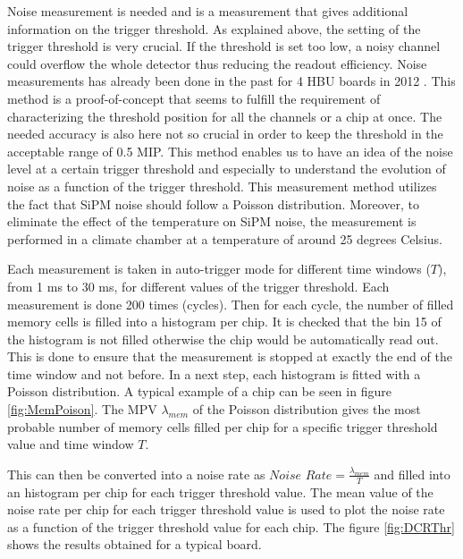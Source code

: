 Noise measurement is needed and is a measurement that gives additional information on the trigger threshold. As explained above, the setting of the trigger threshold is very crucial. If the threshold is set too low, a noisy channel could overflow the whole detector thus reducing the readout efficiency. Noise measurements has already been done in the past for 4 HBU boards in 2012 \cite{Hermberg:2015gaa}. This method is a proof-of-concept that seems to fulfill the requirement of characterizing the threshold position for all the channels or a chip at once. The needed accuracy is also here not so crucial in order to keep the threshold in the acceptable range of 0.5 MIP. This method enables us to have an idea of the noise level at a certain trigger threshold and especially to understand the evolution of noise as a function of the trigger threshold. This measurement method utilizes the fact that SiPM noise should follow a Poisson distribution. Moreover, to eliminate the effect of the temperature on SiPM noise, the measurement is performed in a climate chamber at a temperature of around 25 degrees Celsius.

Each measurement is taken in auto-trigger mode for different time windows ($T$), from 1 ms to 30 ms, for different values of the trigger threshold. Each measurement is done 200 times (cycles). Then for each cycle, the number of filled memory cells is filled into a histogram per chip. It is checked that the bin 15 of the histogram is not filled otherwise the chip would be automatically read out. This is done to ensure that the measurement is stopped at exactly the end of the time window and not before. In a next step, each histogram is fitted with a Poisson distribution. A typical example of a chip can be seen in figure \ref{fig:MemPoison}. The MPV $\lambda_{mem}$ of the Poisson distribution gives the most probable number of memory cells filled per chip for a specific trigger threshold value and time window $T$.

This can then be converted into a noise rate as $\textit{Noise Rate} = \frac{\lambda_{mem}}{T}$ and filled into an histogram per chip for each trigger threshold value. The mean value of the noise rate per chip for each trigger threshold value is used to plot the noise rate as a function of the trigger threshold value for each chip. The figure \ref{fig:DCRThr} shows the results obtained for a typical board.

